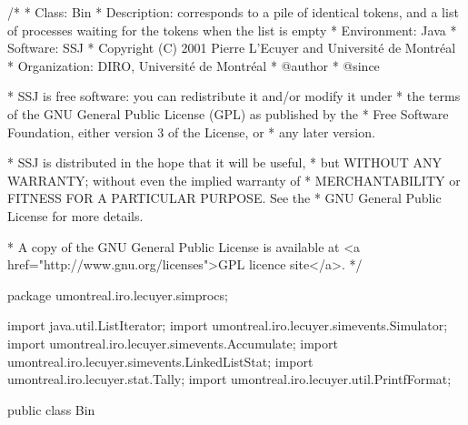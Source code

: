 \begin{code}
\begin{hide}
/*
 * Class:        Bin
 * Description:  corresponds to a pile of identical tokens, and a list of
                 processes waiting for the tokens when the list is empty
 * Environment:  Java
 * Software:     SSJ 
 * Copyright (C) 2001  Pierre L'Ecuyer and Université de Montréal
 * Organization: DIRO, Université de Montréal
 * @author       
 * @since

 * SSJ is free software: you can redistribute it and/or modify it under
 * the terms of the GNU General Public License (GPL) as published by the
 * Free Software Foundation, either version 3 of the License, or
 * any later version.

 * SSJ is distributed in the hope that it will be useful,
 * but WITHOUT ANY WARRANTY; without even the implied warranty of
 * MERCHANTABILITY or FITNESS FOR A PARTICULAR PURPOSE.  See the
 * GNU General Public License for more details.

 * A copy of the GNU General Public License is available at
   <a href="http://www.gnu.org/licenses">GPL licence site</a>.
 */
\end{hide}
package umontreal.iro.lecuyer.simprocs;
\begin{hide}
import java.util.ListIterator;
import umontreal.iro.lecuyer.simevents.Simulator;
import umontreal.iro.lecuyer.simevents.Accumulate;
import umontreal.iro.lecuyer.simevents.LinkedListStat;
import umontreal.iro.lecuyer.stat.Tally;
import umontreal.iro.lecuyer.util.PrintfFormat;
\end{hide}

public class Bin \begin{hide} {

   private static final int FIFO  = 1;
   private static final int LIFO  = 2;

    // Variables

        private ProcessSimulator sim;
        private String name;
        private int available = 0;
        private int policy = FIFO;
        private LinkedListStat<UserRecord> waitingList;
        private ListIterator<UserRecord> iter;
        private Accumulate statAvail;
        private boolean stats;
        private double     initStatTime;

\end{hide}\end{code}

